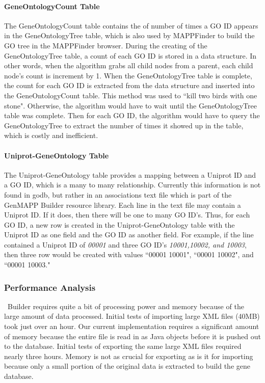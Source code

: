 \paragraph{GeneOntologyCount Table}
The GeneOntologyCount table contains the of number of times a GO ID appears in the GeneOntologyTree table, which
is also used by MAPPFinder to build the GO tree in the MAPPFinder browser. During the creating of the GeneOntologyTree
table, a count of each GO ID is stored in a data structure. In other words, when the algorithm grabs all child nodes from
a parent, each child node's count is increment by 1. When the GeneOntologyTree table is complete, the count for
each GO ID is extracted from the data structure and inserted into the GeneOntologyCount table.
This method was used to ``kill two birds with one stone". Otherwise,
the algorithm would have to wait until the GeneOntologyTree table was complete. Then for each GO ID, the algorithm would have
to query the GeneOntologyTree to extract the number of times it showed up in the table, which is costly and inefficient.


\paragraph{Uniprot-GeneOntology Table}
The Uniprot-GeneOntology table provides a mapping between a Uniprot ID and a GO ID, which is a many to many relationship.
Currently this information is not found in godb, but rather in an associations text file which is part of the GenMAPP Builder
resource library. Each line in the text file may contain a Uniprot ID. If it does, then there will be one to many GO ID's.
Thus, for each GO ID, a new row is created in the Uniprot-GeneOntology table with the Uniprot ID as one field and the GO ID
as another field. For example, if the line contained a Uniprot ID of \emph{00001} and three GO ID's \emph{10001,10002, and 10003},
then three row would be created with values ``00001 10001", ``00001 10002", and ``00001 10003."

\subsubsection{Performance Analysis}
\genmapp~Builder requires quite a bit of processing power and memory because of the large amount of data processed.  Initial tests of importing large XML files (40MB) took just over an hour.  Our current implementation requires a significant amount of memory because the entire file is read in as Java objects before it is pushed out to the database. Initial tests of exporting the same large XML files required nearly three hours.  Memory is not as crucial for exporting as is it for importing because only a small portion of the original data is extracted to build the \genmapp gene database.


